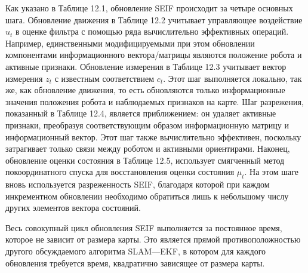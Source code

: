 \documentclass[10pt,a4paper]{article}
\begin{document}
Как указано в Таблице 12.1, обновление SEIF происходит за четыре основных шага. Обновление движения в Таблице 12.2 учитывает управляющее воздействие $u_t$ в оценке фильтра с помощью ряда вычислительно эффективных операций. Например, единственными модифицируемыми при этом обновлении компонентами информационного вектора/матрицы являются положение робота и активные признаки. Обновление измерения в Таблице 12.3 учитывает вектор измерения $z_t$ с известным соответствием $c_t$. Этот шаг выполняется локально, так же, как обновление движения, то есть обновляются только информационные значения положения робота и наблюдаемых признаков на карте. Шаг разрежения, показанный в Таблице 12.4, является приближением: он удаляет активные признаки, преобразуя соответствующим образом информационную матрицу и информационный вектор. Этот шаг также вычислительно эффективен, поскольку затрагивает только связи между роботом и активными ориентирами. Наконец, обновление оценки состояния в Таблице 12.5, использует смягченный метод покоординатного спуска для восстановления оценки состояния $\mu_t$. На этом шаге вновь используется разреженность SEIF, благодаря которой при каждом инкрементном обновлении необходимо обратиться лишь к небольшому числу других элементов вектора состояний. 

Весь совокупный цикл обновления SEIF выполняется за постоянное время, которое не зависит от размера карты. Это является прямой противоположностью другого обсуждаемого алгоритма SLAM—EKF, в котором для каждого обновления требуется время, квадратично зависящее от размера карты. 
\end{document}
